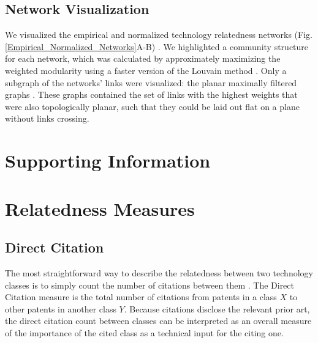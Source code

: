 \documentclass[pre,reprint,groupedaddress,superscriptaddress]{revtex4-1}
\let\bibfont\relax
\newcommand{\beginsupplement}{%
\setcounter{table}{0}    \renewcommand{\thetable}{S\arabic{table}}     \setcounter{figure}{0} \renewcommand{\thefigure}{S\arabic{figure}}
}
\begin{document}
\subsection{Network Visualization}
We visualized the empirical and normalized technology relatedness networks %
(Fig. \ref{Empirical_Normalized_Networks}A-B)%
. We highlighted a community structure for each network, which was calculated by approximately maximizing the weighted modularity using a faster version of the Louvain method \cite{Newman2004, Blondel2008, Traag2015}. Only a subgraph of the networks' links were visualized: the planar maximally filtered graphs \cite{Tumminello2005}. These graphs contained the set of links with the highest weights that were also topologically planar, such that they could be laid out flat on a plane without links crossing.







%     

\newpage

\beginsupplement

\section*{Supporting Information}

\section{Relatedness Measures}\label{relatednessmeasures}
\subsection{Direct Citation}
The most straightforward way to describe the relatedness between two technology classes is to simply count the number of citations between them \cite{Leten2007}. The Direct Citation measure is the total number of citations from patents in a class $X$ to other patents in another class $Y$. Because citations disclose the relevant prior art, the direct citation count between classes can be interpreted as an overall measure of the importance of the cited class as a technical input for the citing one. 
\end{document}
